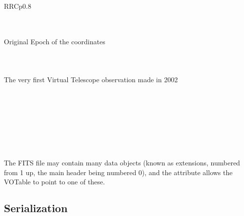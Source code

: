 \begin{tabular}{RRCp{0.8\textwidth}}
\begin{center}
{\begin{plain}\small
{}\\
\hspace*{0.5em}\\
        \hspace*{1em}
	Original Epoch of the coordinates\\
\hspace*{0.5em} \\
\hspace*{0.5em}\\
\hspace*{0.5em}\\
  \hspace*{1em}
  The very first Virtual Telescope observation made in 2002\\
\hspace*{0.5em} \\
\hspace*{0.5em} \\
\hspace*{1.0em}\\
\hspace*{1.0em}\\
\hspace*{1.5em}\\
\hspace*{1.0em} \\
\hspace*{0.5em}\\
\end{plain}

The FITS file may contain many data objects (known as extensions, 
numbered from 1 up, the main header being numbered 0), and the
 attribute allows the VOTable to point to one of
these.


\subsection{\texorpdfstring{ Serialization}
                           {BINARY Serialization}}
\label{sec:BIN}

}
\end{center}
\end{tabular}
